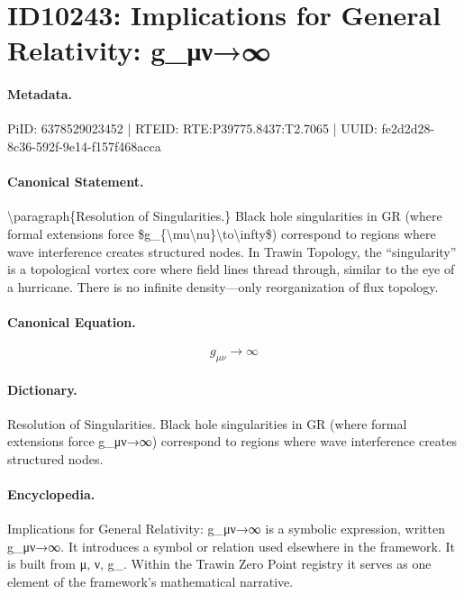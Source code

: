 \section*{ID10243: Implications for General Relativity: g\_μν→∞}
\paragraph{Metadata.}
PiID: 6378529023452 | RTEID: RTE:P39775.8437:T2.7065 | UUID: fe2d2d28-8c36-592f-9e14-f157f468acca

\paragraph{Canonical Statement.}
\textbackslash{}paragraph\{Resolution of Singularities.\} Black hole singularities in GR (where formal extensions force \$g\_\{\textbackslash{}mu\textbackslash{}nu\}\textbackslash{}to\textbackslash{}infty\$) correspond to regions where wave interference creates structured nodes. In Trawin Topology, the ``singularity'' is a topological vortex core where field lines thread through, similar to the eye of a hurricane. There is no infinite density—only reorganization of flux topology.

\paragraph{Canonical Equation.}
\[
g_{\mu\nu}\to\infty
\]

\paragraph{Dictionary.}
Resolution of Singularities. Black hole singularities in GR (where formal extensions force g\_μν→∞) correspond to regions where wave interference creates structured nodes.

\paragraph{Encyclopedia.}
Implications for General Relativity: g\_μν→∞ is a symbolic expression, written g\_μν→∞. It introduces a symbol or relation used elsewhere in the framework. It is built from μ, ν, g\_. Within the Trawin Zero Point registry it serves as one element of the framework's mathematical narrative.
